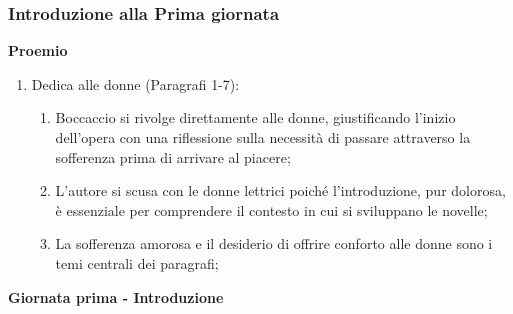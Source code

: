 \documentclass{article}
\begin{document}
\subsubsection{Introduzione alla Prima giornata}
\textbf{Proemio}
\begin{enumerate}
    \item Dedica alle donne (Paragrafi 1-7):
        \begin{enumerate}[label*=\arabic*.]
            \item Boccaccio si rivolge direttamente alle donne, giustificando l'inizio
                dell'opera con una riflessione sulla necessità di passare attraverso la
                sofferenza prima di arrivare al piacere;
            \item L'autore si scusa con le donne lettrici poiché l'introduzione, pur dolorosa,
                è essenziale per comprendere il contesto in cui si sviluppano le novelle;
            \item La sofferenza amorosa e il desiderio di offrire conforto alle donne sono
                i temi centrali dei paragrafi;
        \end{enumerate}
\end{enumerate}
\textbf{Giornata prima - Introduzione}    
\end{document}
